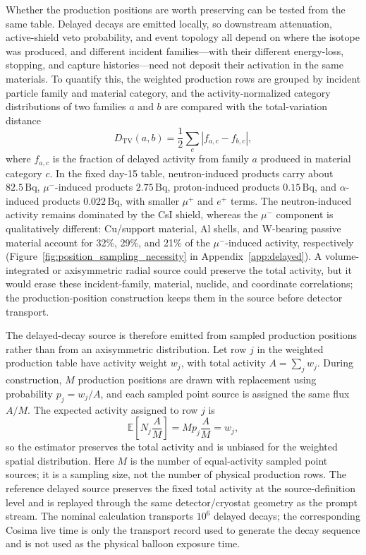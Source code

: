 \documentclass[11pt]{article}
\begin{document}
Whether the production positions are worth preserving can be tested from the
same table. Delayed decays are emitted locally, so downstream attenuation,
active-shield veto probability, and event topology all depend on where the
isotope was produced, and different incident families---with their different
energy-loss, stopping, and capture histories---need not deposit their
activation in the same materials. To quantify this, the weighted production
rows are grouped by incident particle family and material category, and the
activity-normalized category distributions of two families $a$ and $b$ are
compared with the total-variation distance
\begin{equation}
  D_{\mathrm{TV}}(a,b) =
  \frac{1}{2}\sum_c \left| f_{a,c} - f_{b,c} \right| ,
\end{equation}
where $f_{a,c}$ is the fraction of delayed activity from family $a$ produced
in material category $c$. In the fixed day-15 table, neutron-induced products
carry about $82.5\,\mathrm{Bq}$, $\mu^-$-induced products $2.75\,\mathrm{Bq}$,
proton-induced products $0.15\,\mathrm{Bq}$, and $\alpha$-induced products
$0.022\,\mathrm{Bq}$, with smaller $\mu^+$ and $e^+$ terms. The
neutron-induced activity remains dominated by the CsI shield, whereas the
$\mu^-$ component is qualitatively different: Cu/support material, Al shells,
and W-bearing passive material account for 32\%, 29\%, and 21\% of the
$\mu^-$-induced activity, respectively
(Figure~\ref{fig:position_sampling_necessity} in Appendix~\ref{app:delayed}).
A volume-integrated or axisymmetric radial source could preserve the total
activity, but it would erase these incident-family, material, nuclide, and
coordinate correlations; the production-position construction keeps them in
the source before detector transport.

The delayed-decay source is therefore emitted from sampled production positions
rather than from an axisymmetric distribution. Let row $j$ in the weighted
production table have activity weight $w_j$, with total activity
$A=\sum_j w_j$. During construction, $M$ production positions are drawn with
replacement using probability $p_j=w_j/A$, and each sampled point source is
assigned the same flux $A/M$. The expected activity assigned to row $j$ is
\begin{equation}
  \mathbb{E}\!\left[N_j\frac{A}{M}\right] = M p_j \frac{A}{M} = w_j ,
\end{equation}
so the estimator preserves the total activity and is unbiased for the weighted
spatial distribution. Here $M$ is the number of equal-activity sampled point
sources; it is a sampling size, not the number of physical production rows. The
reference delayed source preserves the fixed total activity at the
source-definition level and is replayed through the same detector/cryostat
geometry as the prompt stream. The nominal calculation transports $10^6$
delayed decays; the corresponding Cosima live time is only the transport record
used to generate the decay sequence and is not used as the physical balloon
exposure time.
\end{document}
